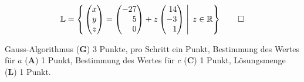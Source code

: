 \begin{loesung}
\begin{teilaufgaben}
\[
\mathbb{L}
=
\left\{
\left.
\begin{pmatrix}x\\y\\z\end{pmatrix}
=
\begin{pmatrix*}[r]-27\\5\\0\end{pmatrix*}
+z
\begin{pmatrix*}[r]14\\-3\\1\end{pmatrix*}
\;\right|\;
z\in\mathbb{R}
\right\}
\qedhere
\]
\end{teilaufgaben}
\end{loesung}

\begin{bewertung}
Gauss-Algorithmus ({\bf G}) 3 Punkte, pro Schritt ein Punkt,
Bestimmung des Wertes für $a$ ({\bf A}) 1 Punkt,
Bestimmung des Wertes für $c$ ({\bf C}) 1 Punkt,
Lösungsmenge ({\bf L}) 1 Punkt.
\end{bewertung}

